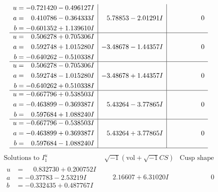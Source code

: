 \documentclass[1p]{elsarticle_modified}
\theoremstyle{definition}
\newcommand{\I}{\sqrt{-1}}
\begin{document}
$$\begin{array}{c|c|c}
\begin{aligned}
u &= -0.721420 - 0.496127 I \\
a &= \phantom{-}0.410786 - 0.364333 I \\
b &= -0.601352 + 1.139610 I\end{aligned}
 & \phantom{-}5.78853 - 2.01291 I & \phantom{-0.000000 } 0 \\ \hline\begin{aligned}
u &= \phantom{-}0.506278 + 0.705306 I \\
a &= \phantom{-}0.592748 + 1.015280 I \\
b &= -0.640262 - 0.510338 I\end{aligned}
 & -3.48678 - 1.44357 I & \phantom{-0.000000 } 0 \\ \hline\begin{aligned}
u &= \phantom{-}0.506278 - 0.705306 I \\
a &= \phantom{-}0.592748 - 1.015280 I \\
b &= -0.640262 + 0.510338 I\end{aligned}
 & -3.48678 + 1.44357 I & \phantom{-0.000000 } 0 \\ \hline\begin{aligned}
u &= -0.667796 + 0.538503 I \\
a &= -0.463899 - 0.369387 I \\
b &= \phantom{-}0.597684 + 1.088240 I\end{aligned}
 & \phantom{-}5.43264 - 3.77865 I & \phantom{-0.000000 } 0 \\ \hline\begin{aligned}
u &= -0.667796 - 0.538503 I \\
a &= -0.463899 + 0.369387 I \\
b &= \phantom{-}0.597684 - 1.088240 I\end{aligned}
 & \phantom{-}5.43264 + 3.77865 I & \phantom{-0.000000 } 0\\
 \hline 
 \end{array}$$\newpage$$\begin{array}{c|c|c}  
\text{Solutions to }I^u_{1}& \I (\text{vol} + \sqrt{-1}CS) & \text{Cusp shape}\\
 \hline 
\begin{aligned}
u &= \phantom{-}0.832730 + 0.200752 I \\
a &= -0.37783 - 2.53219 I \\
b &= -0.332435 + 0.487767 I\end{aligned}
 & \phantom{-}2.16607 + 6.31020 I & \phantom{-0.000000 } 0 \\ \hline\begin{aligned}

\end{aligned}
\end{array}$$
\end{document}
